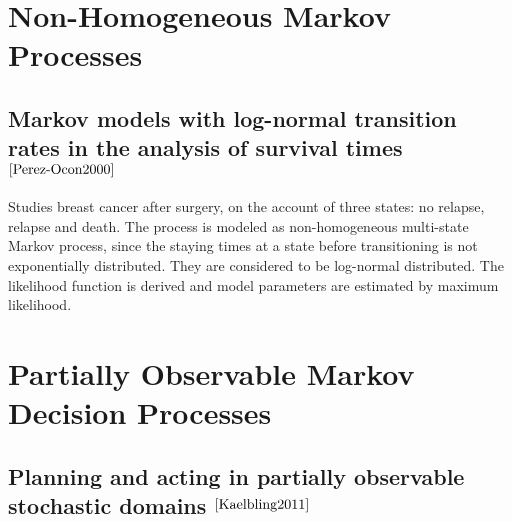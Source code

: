 \documentclass[]{article}
\begin{document}
\section{Non-Homogeneous Markov Processes}
\subsection{Markov models with log-normal transition rates in the analysis of survival times $ ^{\cite{Perez-Ocon2000}} $}
Studies breast cancer after surgery, on the account of three states: no relapse, relapse and death. The process is modeled as non-homogeneous multi-state Markov process, since the staying times at a state before transitioning is not exponentially distributed. They are considered to be log-normal distributed. The likelihood function is derived and model parameters are estimated by maximum likelihood.


\section{Partially Observable Markov Decision Processes}
\subsection{Planning and acting in partially observable stochastic domains $ ^{\cite{Kaelbling2011}} $}

\pagebreak


\end{document}
